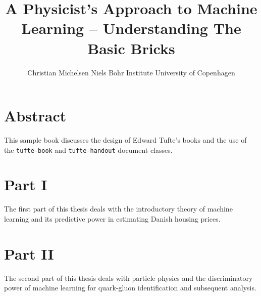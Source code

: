 \documentclass[a4paper, twoside, nobib]{tufte-book}
\title[A Physicist's Approach To Machine Learning -- Understanding The Basic Bricks]{A Physicist's \newline \noindent 
       Approach to \newline \noindent 
       Machine Learning \newline \noindent
       --  \newline \noindent
       Understanding  \newline \noindent
       The Basic Bricks}
\author[Christian Michelsen]{\newline \noindent 
        Christian Michelsen \newline \noindent 
        Niels Bohr Institute \newline \noindent 
        University of Copenhagen \newline }
\newcommand{\doccls}[1]{\texttt{#1}}%
\begin{document}
\maketitle



\tableofcontents

\listoffigures

\listoftables


\cleardoublepage


\chapter{Abstract}

This sample book discusses the design of Edward Tufte's books
and the use of the \doccls{tufte-book} and \doccls{tufte-handout} document classes.

\mainmatter





\chapter*{Part I}
The first part of this thesis deals with the introductory theory of machine learning and its predictive power in estimating Danish housing prices.






\chapter*{Part II}
The second part of this thesis deals with particle physics and the discriminatory power of machine learning for quark-gluon identification and subsequent analysis. 
\end{document}
